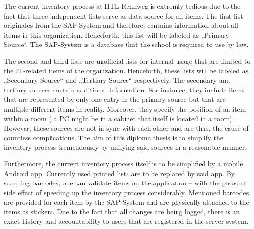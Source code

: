 The current inventory process at HTL Rennweg is extremly tedious due to the fact that three independent lists serve as 
data source for all items. The first list originates from the SAP-System and therefore, contains information about all items in this organization.
Henceforth, this list will be labeled as „Primary Source“. The SAP-System is a database that the school is required to use by law. 

The second and third lists are unofficial lists for internal usage that are limited to the IT-related items of the organization. 
Henceforth, these lists will be labeled as „Secondary Source“ and „Tertiary Source“ respectively.
The secondary and tertiary sources contain additional information. For instance, they include items that are represented by only one entry in the primary source but that are multiple different items in reality. Moreover, they specify the position of an item within a room (\eg{} a PC might be in a cabinet that itself is located in a room).
However, these sources are not in sync with each other and are thus, the cause 
of countless complications. The aim of this diploma thesis is to simplify the inventory process tremendously by unifying said sources in a reasonable manner.

Furthermore, the current inventory process itself is to be simplified by a mobile Android app. Currently used printed lists are to be replaced 
by said app. By scanning barcodes, one can validate items on the application -- with the pleasant side effect of speeding up the inventory process
considerably. Mentioned barcodes are provided for each item by the SAP-System and are physically attached to the items as stickers. 
Due to the fact that all changes are being logged, there is an exact history and accountability to users that are registered in the server system.